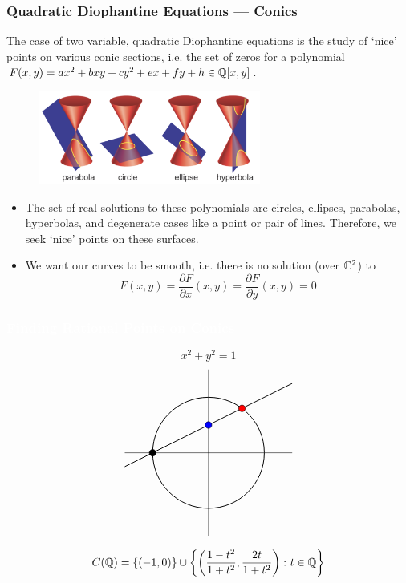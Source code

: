 \begin{frame}[plain] \frametitle{Quadratic Diophantine Equations --- Conics} \small
The case of two variable, quadratic Diophantine equations is the study of `nice' points on various conic sections, i.e. the set of zeros for a polynomial $F(x,y)= ax^2+bxy + cy^2 + ex+fy+h \in \mathbb{Q}[x,y]$. \pspace
	
	\begin{figure}[ht]
	\centering
	\includegraphics[width=0.65\textwidth]{images/conics.png}
	\end{figure}

\begin{itemize}
\item The set of real solutions to these polynomials are circles, ellipses, parabolas, hyperbolas, and degenerate cases like a point or pair of lines. Therefore, we seek `nice' points on these surfaces.

\item We want our curves to be smooth, i.e. there is no solution (over $\mathbb{C}^2$) to
	\[
	F(x,y)= \dfrac{\partial F}{\partial x}(x,y)= \dfrac{\partial F}{\partial y}(x,y)= 0
	\]
\end{itemize}

\end{frame}



\begin{frame}[plain,t]
\frametitle{\textcolor{white}{Finding Rational Points on Conics}}
	\[
	x^2 + y^2 = 1 
	\] \vfill
	\[
	\begin{tikzpicture}[scale=1.75]
	\draw (-1.5,0) -- (1.5,0);
	\draw (0,-1.5) -- (0,1.5);

	\draw[line width=0.7] (-1.5,-0.25) -- (1.5,1.25);
	\draw[line width=0.7] (0,0) circle (1);
	
	\draw[fill=black] (-1,0) circle (0.06);
	\draw[fill=blue] (0,0.5) circle (0.06);
	\draw[fill=red] (0.6,0.8) circle (0.06);
	\end{tikzpicture}
	\] \vfill
	\[
	C(\mathbb{Q})= \{ (-1,0) \} \cup \left\{ \left(\dfrac{1-t^2}{1+t^2}, \dfrac{2t}{1+t^2} \right) \colon t \in \mathbb{Q} \right\}
	\] \pspace
\end{frame}



